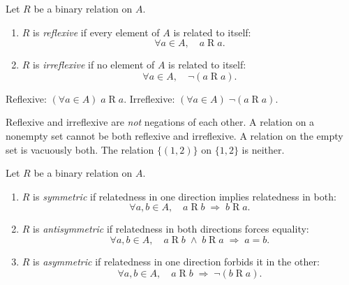 \begin{tcolorbox}[colback=propbox, colframe=propborder, arc=2pt,
  left=6pt, right=6pt, top=4pt, bottom=4pt,
  title={\small\textbf{Definition (Reflexive / Irreflexive)}},
  fonttitle=\small\bfseries]
\label{def:rel-reflexive}
\label{def:rel-irreflexive}
Let $R$ be a binary relation on $A$.
\begin{enumerate}[label=(\roman*)]
  \item $R$ is \emph{reflexive} if every element of $A$ is related to itself:
        \[
          \forall a \in A,\quad a \mathrel{R} a.
        \]
  \item $R$ is \emph{irreflexive} if no element of $A$ is related to itself:
        \[
          \forall a \in A,\quad \lnot(a \mathrel{R} a).
        \]
\end{enumerate}
\end{tcolorbox}

\begin{remark}
Reflexive: $(\forall a \in A)\; a \mathrel{R} a$.
\quad
Irreflexive: $(\forall a \in A)\; \lnot(a \mathrel{R} a)$.
\end{remark}

\begin{remark}[Independence]
Reflexive and irreflexive are \emph{not} negations of each other.
A relation on a nonempty set cannot be both reflexive and irreflexive.
A relation on the empty set is vacuously both.
The relation $\{(1,2)\}$ on $\{1,2\}$ is neither.
\end{remark}

\begin{tcolorbox}[colback=propbox, colframe=propborder, arc=2pt,
  left=6pt, right=6pt, top=4pt, bottom=4pt,
  title={\small\textbf{Definition (Symmetric / Antisymmetric / Asymmetric)}},
  fonttitle=\small\bfseries]
\label{def:rel-symmetric}
\label{def:rel-antisymmetric}
\label{def:rel-asymmetric}
Let $R$ be a binary relation on $A$.
\begin{enumerate}[label=(\roman*)]
  \item $R$ is \emph{symmetric} if relatedness in one direction implies
        relatedness in both:
        \[
          \forall a,b \in A,\quad a \mathrel{R} b \;\Rightarrow\; b \mathrel{R} a.
        \]
  \item $R$ is \emph{antisymmetric} if relatedness in both directions
        forces equality:
        \[
          \forall a,b \in A,\quad
          a \mathrel{R} b \;\land\; b \mathrel{R} a \;\Rightarrow\; a = b.
        \]
  \item $R$ is \emph{asymmetric} if relatedness in one direction forbids
        it in the other:
        \[
          \forall a,b \in A,\quad
          a \mathrel{R} b \;\Rightarrow\; \lnot(b \mathrel{R} a).
        \]
\end{enumerate}
\end{tcolorbox}

